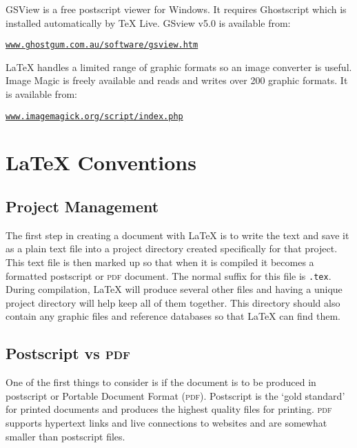 \documentclass[12pt, a4paper]{article}
\begin{document}
GSView is a free postscript viewer for Windows. It requires Ghostscript which is installed automatically by TeX Live. GSview v5.0 is available from: 

\begin{flushleft}
\texttt{\url{www.ghostgum.com.au/software/gsview.htm}}
\end{flushleft}


LaTeX handles a limited range of graphic formats so an image converter is useful. Image Magic is freely available and reads and writes over 200 graphic formats. It is available from: 

\begin{flushleft}
\texttt{\url{www.imagemagick.org/script/index.php}}
\end{flushleft}

\clearpage


\section{LaTeX Conventions}

\subsection{Project Management}

The first step in creating a document with LaTeX is to write the text and save it as a plain text file into a project directory created specifically for that project. This text file is then marked up so that when it is compiled it becomes a formatted postscript or \textsc{pdf} document. The normal suffix for this file is \texttt{.tex}. During compilation, LaTeX will produce several other files and having a unique project directory will help keep all of them together. This directory should also contain any graphic files and reference databases so that LaTeX can find them.


\subsection{Postscript vs \textsc{pdf}}

One of the first things to consider is if the document is to be produced in postscript or Portable Document Format (\textsc{pdf}). Postscript is the `gold standard’ for printed documents and produces the highest quality files for printing. \textsc{pdf} supports hypertext links and live connections to websites and are somewhat smaller than postscript files.
\end{document}
